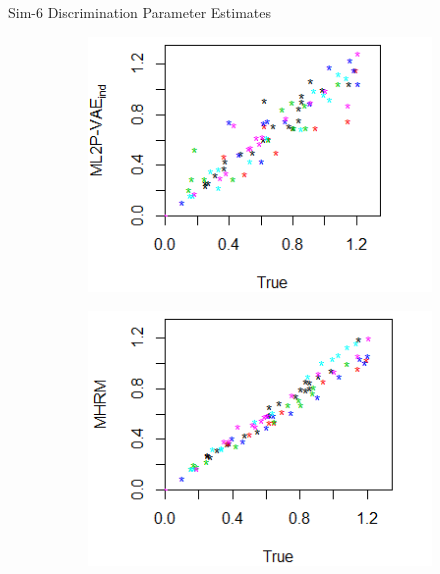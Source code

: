 \documentclass{beamer}
\theoremstyle{definition}
\begin{document}
\begin{frame}{Sim-6 Discrimination Parameter Estimates}
\begin{figure}[h]
\begin{subfigure}{.32\textwidth}
    \end{subfigure}
    \begin{subfigure}{.32\textwidth}
      \centering
      \includegraphics[width=.9\linewidth]{../img/ml_journal_results/6skills/vae_ind_disc_6skills.png}
    \end{subfigure}
    \begin{subfigure}{.32\textwidth}
      \centering
      \includegraphics[width=.9\linewidth]{../img/ml_journal_results/6skills/mhrm_disc_6skills.png}
    \end{subfigure}
    \begin{subfigure}{.32\textwidth}
      \centering

\end{subfigure}
\end{figure}
\end{frame}
\end{document}
